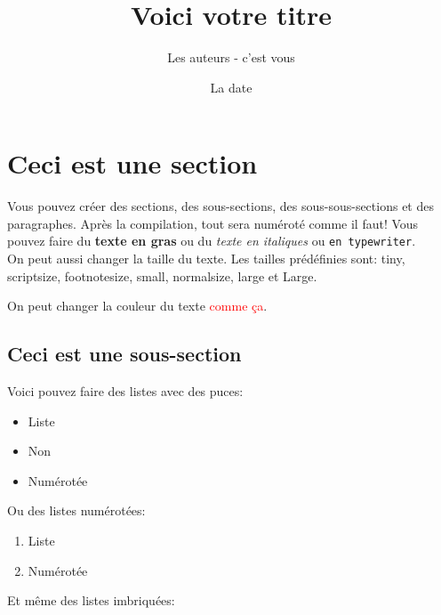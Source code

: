 \documentclass[paper=a4, fontsize=11pt]{article}
\begin{document}
\title{Voici votre titre}
\author{Les auteurs - c'est vous}
\date{La date}
\maketitle

\section{Ceci est une section}
Vous pouvez créer des sections, des sous-sections, des sous-sous-sections et des paragraphes. Après
la compilation, tout sera numéroté comme il faut! Vous pouvez faire du \textbf{texte en gras} ou du
\textit{texte en italiques} ou \texttt{en typewriter}. \\

On peut aussi {\small changer} {\large la taille} {\tiny du texte}.  Les tailles prédéfinies sont:
{\tiny tiny}, {\scriptsize scriptsize}, {\footnotesize footnotesize}, {\small small}, {\normalsize
  normalsize}, {\large large} et {\Large Large}.

On peut changer la couleur du texte \textcolor{red}{comme ça}.

\subsection{Ceci est une sous-section}
Voici pouvez faire des listes avec des puces:

\begin{itemize}
\item Liste
\item Non
\item Numérotée
\end{itemize}

\vspace{0.5cm} %

Ou des listes numérotées:
\begin{enumerate}
\item Liste
\item Numérotée
\end{enumerate}

\vspace{0.5cm}
Et même des listes imbriquées:
\end{document}
